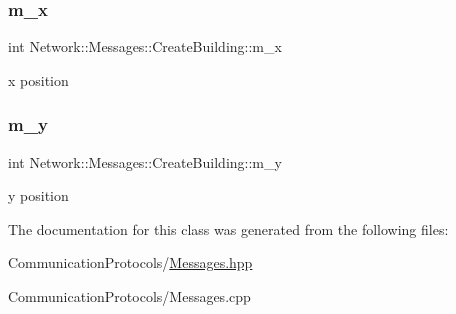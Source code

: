 \subsubsection{\texorpdfstring{m\+\_\+x}{m\_x}}
{\footnotesize\ttfamily int Network\+::\+Messages\+::\+Create\+Building\+::m\+\_\+x}

x position \mbox{\label{class_network_1_1_messages_1_1_create_building_aa051acad8da56c9c40cc627e3464a5fc}} 
\subsubsection{\texorpdfstring{m\+\_\+y}{m\_y}}
{\footnotesize\ttfamily int Network\+::\+Messages\+::\+Create\+Building\+::m\+\_\+y}

y position 

The documentation for this class was generated from the following files\+:\begin{DoxyCompactItemize}
\item 
Communication\+Protocols/\hyperlink{_messages_8hpp}{Messages.\+hpp}\item 
Communication\+Protocols/Messages.\+cpp\end{DoxyCompactItemize}
